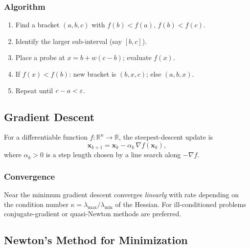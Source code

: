 \subsubsection*{Algorithm}
\begin{enumerate}
  \item Find a bracket $(a,b,c)$ with $f(b)<f(a),\,f(b)<f(c)$.
  \item Identify the larger sub-interval (say $[b,c]$).
  \item Place a probe at $x = b + w(c-b)$; evaluate $f(x)$.
  \item If $f(x)<f(b)$: new bracket is $(b,x,c)$; else $(a,b,x)$.
  \item Repeat until $c-a < \varepsilon$.
\end{enumerate}


\subsection{Gradient Descent}\label{subsec:lec11:gradient}

For a differentiable function $f:\mathbb{R}^n\to\mathbb{R}$, the
steepest-descent update is
\begin{equation}
  \mathbf{x}_{k+1} = \mathbf{x}_k - \alpha_k\,\nabla f(\mathbf{x}_k),
  \label{eq:lec11:gd}
\end{equation}
where $\alpha_k > 0$ is a step length chosen by a line search along
$-\nabla f$.

\subsubsection*{Convergence}
Near the minimum gradient descent converges \emph{linearly} with rate
depending on the condition number $\kappa = \lambda_{\max}/\lambda_{\min}$
of the Hessian.  For ill-conditioned problems conjugate-gradient or
quasi-Newton methods are preferred.

\subsection{Newton's Method for Minimization}\label{subsec:lec11:newton}

